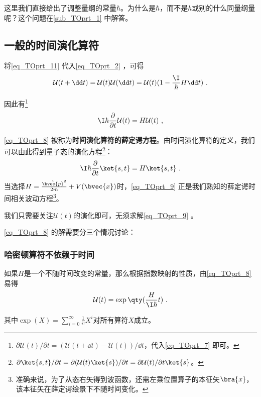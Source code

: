 这里我们直接给出了调整量纲的常量$\hbar$。为什么是$\hbar$，而不是$h$或别的什么同量纲量呢？这个问题在\autoref{sub_TOprt_1} 中解答。



\subsection{一般的时间演化算符}

将\autoref{eq_TOprt_11} 代入\autoref{eq_TOprt_2} ，可得
\begin{equation}\label{eq_TOprt_7}
\mathcal{U}(t+\dd t) = \mathcal{U}(t)\mathcal{U}(\dd t) = \mathcal{U}(t)(1-\frac{\I}{\hbar}H \dd t)~.
\end{equation}

因此有\footnote{$\partial\mathcal{U}(t)/\partial t=(\mathcal{U}(t+\dd t)-\mathcal{U}(t))/\dd t$，代入\autoref{eq_TOprt_7} 即可。}
\begin{equation}\label{eq_TOprt_8}
\I\hbar\frac{\partial}{\partial t}\mathcal{U}(t) = H\mathcal{U}(t)~,
\end{equation}


\autoref{eq_TOprt_8} 被称为\textbf{时间演化算符的薛定谔方程}。由时间演化算符的定义，我们可以由此得到量子态的演化方程\footnote{$\partial\ket{s, t}/\partial t=\partial(\mathcal{U}(t)\ket{s})/\partial t=\partial \mathcal{U}(t)/\partial t \ket{s}$。}：
\begin{equation}\label{eq_TOprt_9}
\I\hbar\frac{\partial}{\partial t}\ket{s, t} = H\ket{s, t}~.
\end{equation}
当选择$H=\frac{\hat{\bvec{p}}^2}{2m}+V(\bvec{x})$时，\autoref{eq_TOprt_9} 正是我们熟知的薛定谔时间相关波动方程\footnote{准确来说，为了从态右矢得到波函数，还需左乘位置算子的本征矢$\bra{x}$，该本征矢在薛定谔绘景下不随时间变化。}。


我们只需要关注$\mathcal{U}(t)$的演化即可，无须求解\autoref{eq_TOprt_9} 。

\autoref{eq_TOprt_8} 的解需要分三个情况讨论：


\subsubsection{哈密顿算符不依赖于时间}

如果$H$是一个不随时间改变的常量，那么根据指数映射的性质，由\autoref{eq_TOprt_8} 易得
\begin{equation}
\mathcal{U}(t) = \exp\qty(\frac{H}{\I \hbar}t)~.
\end{equation}

其中$\exp(X)=\sum_{i=0}^\infty \frac{1}{i!}X^i$对所有算符$X$成立。



